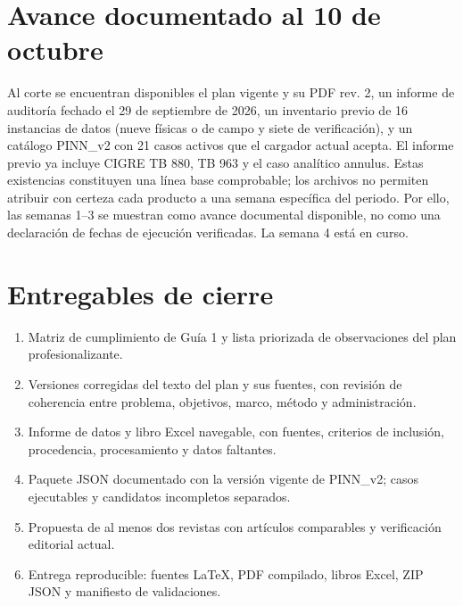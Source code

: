 \documentclass[11pt,a4paper,oneside]{report}
\begin{document}
\section*{Avance documentado al 10 de octubre}
Al corte se encuentran disponibles el plan vigente y su PDF rev. 2, un informe de auditor\'ia fechado el 29 de septiembre de 2026, un inventario previo de 16 instancias de datos (nueve f\'isicas o de campo y siete de verificaci\'on), y un cat\'alogo PINN\_v2 con 21 casos activos que el cargador actual acepta. El informe previo ya incluye CIGRE TB 880, TB 963 y el caso anal\'itico annulus. Estas existencias constituyen una l\'inea base comprobable; los archivos no permiten atribuir con certeza cada producto a una semana espec\'ifica del periodo. Por ello, las semanas 1--3 se muestran como avance documental disponible, no como una declaraci\'on de fechas de ejecuci\'on verificadas. La semana 4 est\'a en curso.

\section*{Entregables de cierre}
\begin{enumerate}
  \item Matriz de cumplimiento de Gu\'ia 1 y lista priorizada de observaciones del plan profesionalizante.
  \item Versiones corregidas del texto del plan y sus fuentes, con revisi\'on de coherencia entre problema, objetivos, marco, m\'etodo y administraci\'on.
  \item Informe de datos y libro Excel navegable, con fuentes, criterios de inclusi\'on, procedencia, procesamiento y datos faltantes.
  \item Paquete JSON documentado con la versi\'on vigente de PINN\_v2; casos ejecutables y candidatos incompletos separados.
  \item Propuesta de al menos dos revistas con art\'iculos comparables y verificaci\'on editorial actual.
  \item Entrega reproducible: fuentes LaTeX, PDF compilado, libros Excel, ZIP JSON y manifiesto de validaciones.
\end{enumerate}
\end{document}
